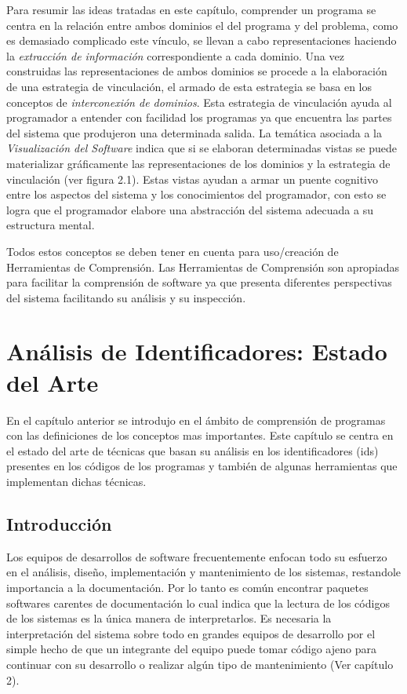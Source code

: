 \documentclass[a4paper,12pt]{report}
\begin{document}
Para resumir las ideas tratadas en este capítulo, comprender un programa se centra en la relación entre ambos dominios el del programa y del problema, como es demasiado complicado este vínculo, se llevan a cabo representaciones haciendo la \textit{extracción de información} correspondiente a cada dominio. Una vez construidas las representaciones de ambos dominios se procede a la elaboración de una estrategia de vinculación, el armado de esta estrategia se basa en los conceptos de \textit{interconexión de dominios}. Esta estrategia de vinculación ayuda al programador a entender con facilidad los programas ya que encuentra las partes del sistema que produjeron una determinada salida. La temática asociada a la \textit{Visualización del Software} indica que si se elaboran determinadas vistas se puede materializar gráficamente las representaciones de los dominios y la estrategia de vinculación (ver figura 2.1). Estas vistas ayudan a armar un puente cognitivo entre los aspectos del sistema y los conocimientos del programador, con esto se logra que el programador elabore una abstracción del sistema adecuada a su estructura mental.

Todos estos conceptos se deben tener en cuenta para uso/creación de Herramientas de Comprensión.
Las Herramientas de Comprensión son apropiadas para facilitar la comprensión de software ya que presenta diferentes perspectivas del sistema facilitando su análisis y su inspección.




\chapter{Análisis de Identificadores: Estado del Arte}


En el capítulo anterior se introdujo en el ámbito de comprensión de programas con las definiciones de los conceptos mas importantes. Este capítulo se centra en el estado del arte de técnicas que basan su análisis en los identificadores (ids) presentes en los códigos de los programas y también de algunas herramientas que implementan dichas técnicas.

\section{Introducción}

Los equipos de desarrollos de software frecuentemente enfocan todo su esfuerzo en el análisis, diseño, implementación y mantenimiento de los sistemas, restandole importancia a la documentación. Por lo tanto es común encontrar paquetes softwares carentes de documentación lo cual indica que la lectura de los códigos de los sistemas es la única manera de interpretarlos. Es necesaria la interpretación del sistema sobre todo en grandes equipos de desarrollo por el simple hecho de que un integrante del equipo puede tomar código ajeno para continuar con su desarrollo o realizar algún tipo de mantenimiento (Ver capítulo 2).
\end{document}
